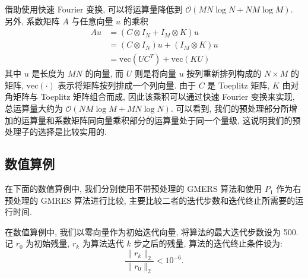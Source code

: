 \documentclass{ecnumaster}
\begin{document}
借助使用快速 Fourier 变换, 可以将运算量降低到 $\mathcal{O}(MN \log N + NM \log M)$.
另外, 系数矩阵 $A$ 与任意向量 $u$ 的乘积
\begin{equation}\label{eq418}
  \begin{split}
    Au &= (C \otimes I_N + I_M \otimes K) u\\
       &= (C \otimes I_N)u + (I_M \otimes K)u\\
       &= \mathrm{vec}(U C^{T}) + \mathrm{vec}(KU)
  \end{split}
\end{equation}
其中 $u$ 是长度为 $MN$ 的向量, 而 $U$ 则是将向量 $u$
按列重新排列构成的 $N \times M$ 的矩阵,
$\mathrm{vec}(\cdot)$ 表示将矩阵按列排成一个列向量.
由于 $C$ 是 Toeplitz 矩阵, $K$ 由对角矩阵与 Toeplitz 矩阵组合而成,
因此该乘积可以通过快速 Fourier 变换来实现,
总运算量大约为 $\mathcal{O}(NM \log M + MN \log N)$.
可以看到,
我们的预处理部分所增加的运算量和系数矩阵同向量乘积部分的运算量处于同一个量级,
这说明我们的预处理子的选择是比较实用的.


\subsection{数值算例} %
在下面的数值算例中,
我们分别使用不带预处理的 GMERS 算法和使用 $P_1$ 作为右预处理的 GMRES 算法进行比较,
主要比较二者的迭代步数和迭代终止所需要的运行时间.

在数值算例中, 我们以零向量作为初始迭代向量, 将算法的最大迭代步数设为 500.
记 $r_0$ 为初始残量, $r_k$ 为算法迭代 $k$ 步之后的残量, 算法的迭代终止条件设为:
\begin{equation}\nonumber
\frac{\|r_{k}\|_2}{\|r_0\|_2}<10^{-6}.
\end{equation}
\end{document}
